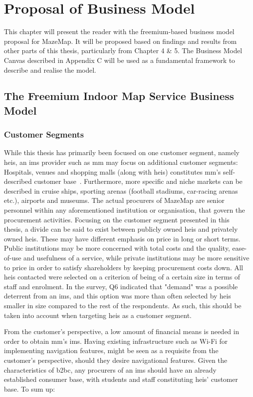 \chapter{Proposal of Business Model}
This chapter will present the reader with the freemium-based business model proposal for MazeMap. It will be proposed based on findings and results from other parts of this thesis, particularly from Chapter 4 \& 5. The Business Model Canvas described in Appendix C will be used as a fundamental framework to describe and realise the model.


\section{The Freemium Indoor Map Service Business Model}
\subsection{Customer Segments}
While this thesis has primarily been focused on one customer segment, namely \glspl{hei}, an \gls{ims} provider such as \gls{mm} may focus on additional customer segments: Hospitals, venues and shopping malls (along with \glspl{hei}) constitutes \gls{mm}'s self-described customer base~\cite{mazemap}. Furthermore, more specific and niche markets can be described in cruise ships, sporting arenas (football stadiums, car-racing arenas etc.), airports and museums. The actual procurers of MazeMap are senior personnel within any aforementioned institution or organisation, that govern the procurement activities. Focusing on the customer segment presented in this thesis, a divide can be said to exist between publicly owned \glspl{hei} and privately owned \glspl{hei}. These may have different emphasis on price in long or short terms. Public institutions may be more concerned with total costs and the quality, ease-of-use and usefulness of a service, while private institutions may be more sensitive to price in order to satisfy shareholders by keeping procurement costs down. All \glspl{hei} contacted were selected on a criterion of being of a certain size in terms of staff and enrolment. In the survey, Q6 indicated that "demand" was a possible deterrent from an \gls{ims}, and this option was more than often selected by \glspl{hei} smaller in size compared to the rest of the respondents. As such, this should be taken into account when targeting \glspl{hei} as a customer segment.


From the customer's perspective, a low amount of financial means is needed in order to obtain \gls{mm}'s \gls{ims}. Having existing infrastructure such as Wi-Fi for implementing navigation features, might be seen as a requisite from the customer's perspective, should they desire navigational features. Given the characteristics of \gls{b2bc}, any procurers of an \gls{ims} should have an already established consumer base, with students and staff constituting \glspl{hei}' customer base. To sum up:


